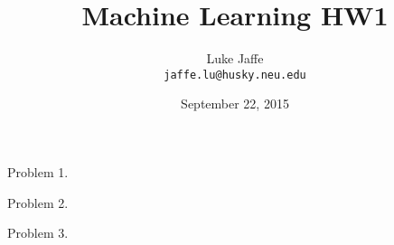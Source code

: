 \documentclass{article}
\begin{document}
\title{\textbf{Machine Learning HW1}}
\author{Luke Jaffe\\
        \texttt{jaffe.lu@husky.neu.edu}}
\date{September 22, 2015}
\maketitle
\newpage     

Problem 1.

Problem 2.

Problem 3.
\end{document}
